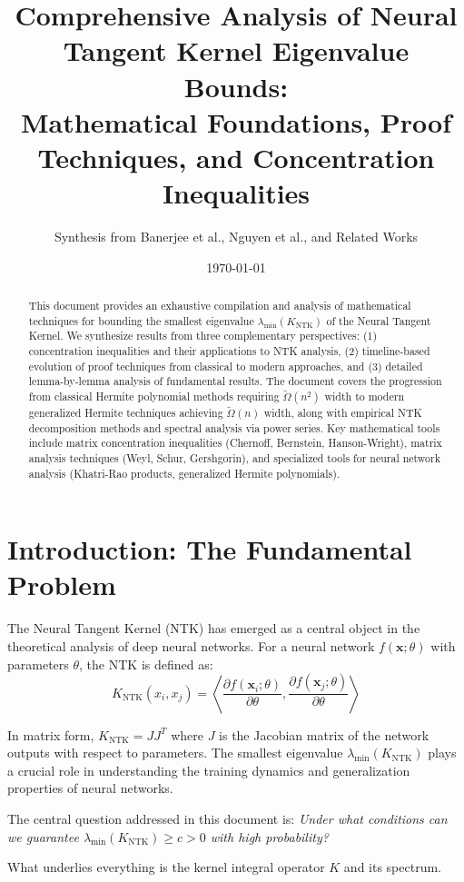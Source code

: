 \documentclass{article}
\title{Comprehensive Analysis of Neural Tangent Kernel Eigenvalue Bounds:\\
Mathematical Foundations, Proof Techniques, and Concentration Inequalities}
\author{Synthesis from Banerjee et al., Nguyen et al., and Related Works}
\date{\today}
\newcommand{\x}{\mathbf{x}}
\newcommand{\KNTK}{K_{\text{NTK}}}
\newcommand{\lambdaMin}{\lambda_{\min}}
\newcommand{\TildeOmega}{\tilde{\Omega}}
\begin{document}
\maketitle

\begin{abstract}
This document provides an exhaustive compilation and analysis of mathematical techniques for bounding the smallest eigenvalue $\lambdaMin(\KNTK)$ of the Neural Tangent Kernel. We synthesize results from three complementary perspectives: (1) concentration inequalities and their applications to NTK analysis, (2) timeline-based evolution of proof techniques from classical to modern approaches, and (3) detailed lemma-by-lemma analysis of fundamental results. The document covers the progression from classical Hermite polynomial methods requiring $\TildeOmega(n^2)$ width to modern generalized Hermite techniques achieving $\TildeOmega(n)$ width, along with empirical NTK decomposition methods and spectral analysis via power series. Key mathematical tools include matrix concentration inequalities (Chernoff, Bernstein, Hanson-Wright), matrix analysis techniques (Weyl, Schur, Gershgorin), and specialized tools for neural network analysis (Khatri-Rao products, generalized Hermite polynomials).
\end{abstract}

\tableofcontents
\newpage

\section{Introduction: The Fundamental Problem}

The Neural Tangent Kernel (NTK) has emerged as a central object in the theoretical analysis of deep neural networks. For a neural network $f(\x; \theta)$ with parameters $\theta$, the NTK is defined as:
$$\KNTK(x_i, x_j) = \left\langle \frac{\partial f(\x_i; \theta)}{\partial \theta}, \frac{\partial f(\x_j; \theta)}{\partial \theta} \right\rangle$$

In matrix form, $\KNTK = JJ^T$ where $J$ is the Jacobian matrix of the network outputs with respect to parameters. The smallest eigenvalue $\lambdaMin(\KNTK)$ plays a crucial role in understanding the training dynamics and generalization properties of neural networks.

The central question addressed in this document is: \textit{Under what conditions can we guarantee $\lambdaMin(\KNTK) \geq c > 0$ with high probability?}

What underlies everything is the kernel integral operator $K$ and its spectrum.
\end{document}

